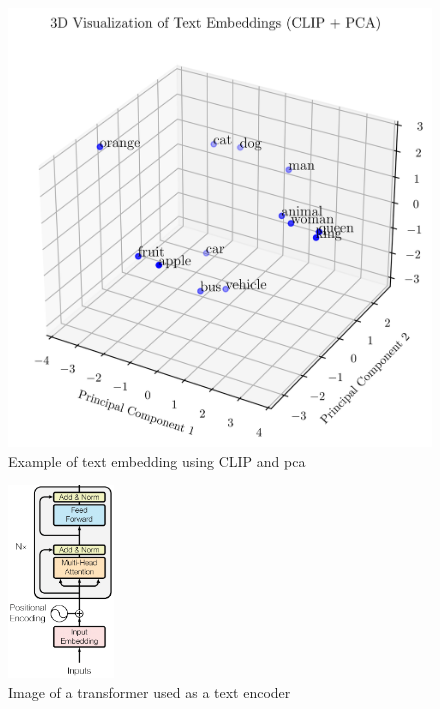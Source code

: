     \begin{figure}
        \centering
        \includegraphics[width=\textwidth]{Images/crossmodalnetworks/3DEmbedding.png}
        \caption{Example of text embedding using CLIP and \Acrshort{pca}}
        \label{fig:crossmodalnetworks:3demb}
    \end{figure}

    \begin{figure}
        \centering
        \includegraphics[width=0.25\textwidth]{Images/crossmodalnetworks/The-Transformer-encoder-structure.png}
        \caption{Image of a transformer used as a text encoder\cite{fig:encoder}}
        \label{fig:crossmodalnetworks:textencoder}
    \end{figure}
    

